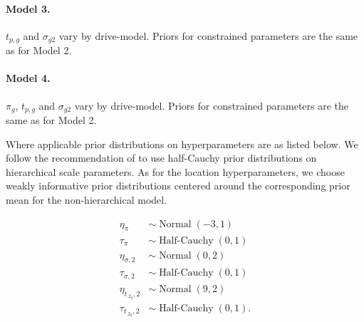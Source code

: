 \documentclass[12pt]{article}
\newcommand{\op}{\operatorname}
\begin{document}
\paragraph{Model 3.} $t_{p,g}$ and $\sigma_{g2}$ vary by drive-model. Priors for constrained parameters are the same as for Model 2.

\paragraph{Model 4.} $\pi_g$, $t_{p,g}$ and $\sigma_{g2}$ vary by drive-model. Priors for constrained parameters are the same as for Model 2.


Where applicable prior distributions on hyperparameters are as listed below. We follow the recommendation of \citet{gelman2014bayesian} to use half-Cauchy prior distributions on hierarchical scale parameters. As for the location hyperparameters, we choose weakly informative prior distributions centered around the corresponding prior mean for the non-hierarchical model.

\begin{align*}
  \eta_{\pi} & \sim \op{Normal}(-3, 1)\\
  \tau_{\pi} & \sim \op{Half-Cauchy}(0, 1)\\
  \eta_{\sigma ,2} & \sim \op{Normal}(0, 2)\\
  \tau_{\sigma ,2} & \sim \op{Half-Cauchy}(0, 1)\\
  \eta_{t_{.2_2},2} & \sim \op{Normal}(9, 2)\\
  \tau_{t_{.2_2},2} & \sim \op{Half-Cauchy}(0, 1).
 \end{align*} 
\end{document}
